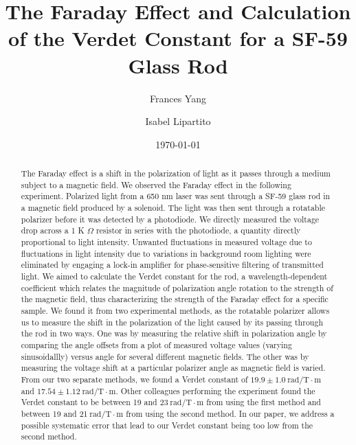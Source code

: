 \documentclass[prb,preprint]{revtex4-1}
\begin{document}
\title{The Faraday Effect and Calculation of the Verdet Constant for a SF-59 Glass Rod}

\author{Frances Yang}

\author{Isabel Lipartito}

\date{\today}

\begin{abstract}
{The Faraday effect is a shift in the polarization of light as it passes through a medium subject to a magnetic field. We observed the Faraday effect in the following experiment. Polarized light from a 650 nm laser was sent through a SF-59 glass rod in a magnetic field produced by a solenoid. The light was then sent through a rotatable polarizer before it was detected by a photodiode.  We directly measured the voltage drop across a 1 K $\Omega$ resistor in series with the photodiode, a quantity directly proportional to light intensity.  Unwanted fluctuations in measured voltage due to fluctuations in light intensity due to variations in background room lighting were eliminated by engaging a lock-in amplifier for phase-sensitive filtering of transmitted light.  We aimed to calculate the Verdet constant for the rod, a wavelength-dependent coefficient which relates the magnitude of polarization angle rotation to the strength of the magnetic field, thus characterizing the strength of the Faraday effect for a specific sample.  We found it from two experimental methods, as the rotatable polarizer allows us to measure the shift in the polarization of the light caused by its passing through the rod in two ways.  One was by measuring the relative shift in polarization angle by comparing the angle offsets from a plot of measured voltage values (varying sinusoidallly) versus angle for several different magnetic fields.  The other was by measuring the voltage shift at a particular polarizer angle as magnetic field is varied.  From our two separate methods, we found a Verdet constant of $19.9 \pm 1.0 \mathrm{~rad/T} \cdot \textrm{m}$ and $17.54 \pm 1.12 \mathrm{~rad/T} \cdot \textrm{m}$. Other colleagues performing the experiment found the Verdet constant to be between 19 and 23$\mathrm{~rad/T} \cdot \textrm{m}$ from using the first method and between 19 and 21$\mathrm{~rad/T} \cdot \textrm{m}$ from using the second method.  In our paper, we address a possible systematic error that lead to our Verdet constant being too low from the second method.
}
\end{abstract}
\end{document}
